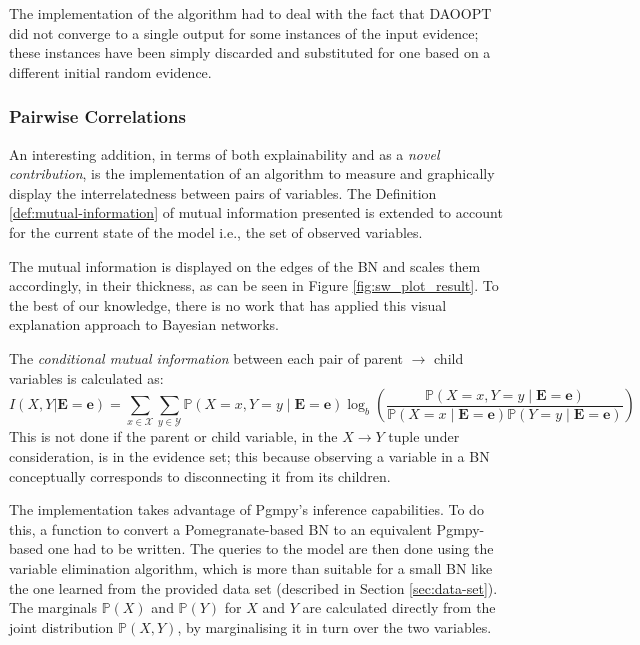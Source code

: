 The implementation of the algorithm had to deal with the fact that DAOOPT did not converge to a single output for some instances of the input evidence; these instances have been simply discarded and substituted for one based on a different initial random evidence.

\subsubsection{Pairwise Correlations}
An interesting addition, in terms of both explainability and as a \textit{novel contribution}, is the implementation of an algorithm to measure and graphically display the interrelatedness between pairs of variables.
The Definition \ref{def:mutual-information} of mutual information presented is extended to account for the current state of the model i.e., the set of observed variables.

The mutual information is displayed on the edges of the BN and scales them accordingly, in their thickness, as can be seen in Figure \ref{fig:sw_plot_result}.
To the best of our knowledge, there is no work that has applied this visual explanation approach to Bayesian networks.

The \textit{conditional mutual information} between each pair of parent $\rightarrow$ child variables is calculated as:
\begin{equation}
	I(X,Y|\boldsymbol{E}=\boldsymbol{e}) = \sum\limits_{x \in \mathcal{X}} \sum\limits_{y \in \mathcal{Y}} \mathbb{P}(X=x,Y=y \mid \boldsymbol{E}=\boldsymbol{e}) \log_{b} \left( \frac{\mathbb{P}(X=x,Y=y \mid \boldsymbol{E}=\boldsymbol{e})}{\mathbb{P}(X=x \mid \boldsymbol{E}=\boldsymbol{e}) \mathbb{P}(Y=y \mid \boldsymbol{E}=\boldsymbol{e})} \right)
\end{equation}
This is not done if the parent or child variable, in the $X \rightarrow Y$ tuple under consideration, is in the evidence set; this because observing a variable in a BN conceptually corresponds to disconnecting it from its children.

The implementation takes advantage of Pgmpy's inference capabilities. 
To do this, a function to convert a Pomegranate-based BN to an equivalent Pgmpy-based one had to be written.
The queries to the model are then done using the variable elimination algorithm, which is more than suitable for a small BN like the one learned from the provided data set (described in Section \ref{sec:data-set}).
The marginals $\mathbb{P}(X)$ and $\mathbb{P}(Y)$ for $X$ and $Y$ are calculated directly from the joint distribution $\mathbb{P}(X,Y)$, by marginalising it in turn over the two variables.

